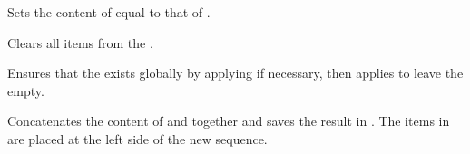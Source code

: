 \documentclass[oneside]{book}
\begin{document}
\begin{function}{\SeqSetEq}
\begin{syntax}
  
\end{syntax}
Sets the content of  equal to that of
.
\begin{demohigh}
\SeqSetFromClist {}
\SeqSetEq \lTmpbSeq \lTmpaSeq
\SeqVarJoin {}
\end{demohigh}
\end{function}

\begin{function}{\SeqClear}
\begin{syntax}
 
\end{syntax}
Clears all items from the .
\begin{codehigh}
\SeqClear \lTmpaSeq
\end{codehigh}
\end{function}

\begin{function}{\SeqClearNew}
\begin{syntax}
 
\end{syntax}
Ensures that the  exists globally by applying
 if necessary, then applies  to leave
the  empty.
\begin{demohigh}
\SeqClearNew \lFooSomeSeq
\SeqSetFromClist {}
\SeqVarJoin {}
\end{demohigh}
\end{function}

\begin{function}{\SeqConcat}
\begin{syntax}
   
\end{syntax}
Concatenates the content of  and 
together and saves the result in . The items in
 are placed at the left side of the new sequence.
\begin{demohigh}
\SeqSetFromClist {}
\SeqSetFromClist {}
\SeqConcat \lTmpaSeq \lTmpbSeq \lTmpcSeq
\SeqVarJoin \lTmpaSeq {, }
\end{demohigh}
\end{function}
\end{document}
